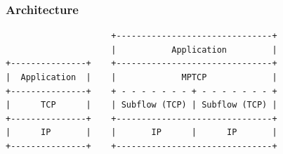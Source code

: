 \documentclass{beamer}
\begin{document}
\begin{frame}[fragile]
  \frametitle{Architecture}
  \begin{center}
\begin{BVerbatim}
                     +-------------------------------+
                     |           Application         |
+---------------+    +-------------------------------+
|  Application  |    |             MPTCP             |
+---------------+    + - - - - - - - + - - - - - - - +
|      TCP      |    | Subflow (TCP) | Subflow (TCP) |
+---------------+    +-------------------------------+
|      IP       |    |       IP      |      IP       |
+---------------+    +-------------------------------+
\end{BVerbatim}
  \end{center}
\end{frame}
\end{document}
